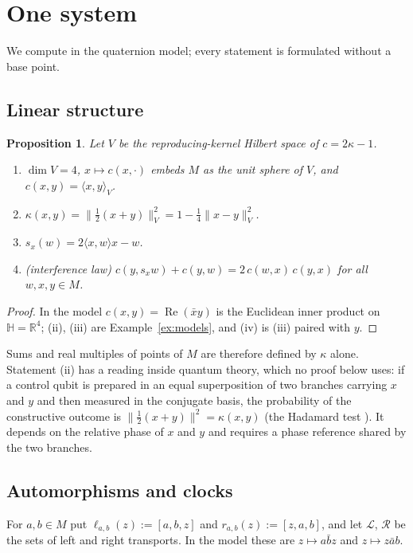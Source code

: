 \documentclass[aps,pra,onecolumn,superscriptaddress,nofootinbib,10pt]{revtex4-2}
\newtheorem{proposition}[theorem]{Proposition}
\theoremstyle{definition}
\theoremstyle{remark}
\newcommand{\R}{\mathbb{R}}
\newcommand{\HH}{\mathbb{H}}
\newcommand{\cL}{\mathcal{L}}
\newcommand{\cR}{\mathcal{R}}
\newcommand{\re}{\operatorname{Re}}
\newcommand{\ip}[2]{\langle #1,#2\rangle}
\newcommand{\hp}[3]{[#1,#2,#3]}
\begin{document}
\section{One system}\label{sec:one}
We compute in the quaternion model; every statement is formulated without a base point.

\subsection{Linear structure}
\begin{proposition}\label{prop:linear}
Let $V$ be the reproducing-kernel Hilbert space of $c=2\kappa-1$.
\begin{enumerate}[label=(\roman*)]
\item $\dim V=4$, $x\mapsto c(x,\cdot)$ embeds $M$ as the unit sphere of $V$, and $c(x,y)=\ip{x}{y}_V$.
\item $\kappa(x,y)=\lVert\tfrac12(x+y)\rVert_V^2=1-\tfrac14\lVert x-y\rVert_V^2$.
\item $s_x(w)=2\ip{x}{w}x-w$.
\item (interference law) $c(y,s_xw)+c(y,w)=2\,c(w,x)\,c(y,x)$ for all $w,x,y\in M$.
\end{enumerate}
\end{proposition}
\begin{proof}
In the model $c(x,y)=\re(\bar xy)$ is the Euclidean inner product on $\HH=\R^4$; (ii), (iii) are
Example~\ref{ex:models}, and (iv) is (iii) paired with $y$.
\end{proof}
Sums and real multiples of points of $M$ are therefore defined by $\kappa$ alone.  Statement (ii)
has a reading inside quantum theory, which no proof below uses: if a control qubit is prepared in an
equal superposition of two branches carrying $x$ and $y$ and then measured in the conjugate basis, the
probability of the constructive outcome is $\lVert\tfrac12(x+y)\rVert^2=\kappa(x,y)$ (the Hadamard test
\cite{AJL}).  It depends on the relative phase of $x$ and $y$ and requires a phase reference shared by
the two branches.

\subsection{Automorphisms and clocks}
For $a,b\in M$ put $\ell_{a,b}(z):=\hp{a}{b}{z}$ and $r_{a,b}(z):=\hp{z}{a}{b}$, and let $\cL$, $\cR$ be
the sets of left and right transports.  In the model these are $z\mapsto a\bar bz$ and $z\mapsto z\bar ab$.
\end{document}
